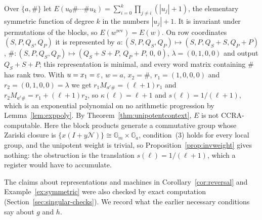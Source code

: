\begin{example}\label{ex:symmetric}
Over $\{a,\#\}$ let $E(u_0\#\cdots\#u_k)=\sum_{i=0}^k\prod_{j\ne i}(|u_j|+1)$, the elementary symmetric function of degree $k$ in the numbers $|u_j|+1$. It is invariant under permutations of the blocks, so $E(w^{\mathrm{rev}})=E(w)$. On row coordinates $(S,P,Q_S,Q_P)$ it is represented by $a:(S,P,Q_S,Q_P)\mapsto(S,P,Q_S+S,Q_P+P)$, $\#:(S,P,Q_S,Q_P)\mapsto(Q_S+S+P,\,Q_P+P,\,0,\,0)$, $\lambda=(0,1,0,0)$ and output $Q_S+S+P$; this representation is minimal, and every word matrix containing $\#$ has rank two. With $u=x_1=\varepsilon$, $w=a$, $x_2=\#$, $r_1=(1,0,0,0)$ and $r_2=(0,1,0,0)=\lambda$ we get $r_1M_{a^\ell\#}=(\ell+1)r_1$ and $r_2M_{a^\ell\#}=r_1+(\ell+1)r_2$, so $\kappa(\ell)=\ell+1$ and $s(\ell)=1/(\ell+1)$, which is an exponential polynomial on no arithmetic progression by Lemma~\ref{lem:exppoly}. By Theorem~\ref{thm:unipotentcontext}, $E$ is not CCRA-computable. Here the block products generate a commutative group whose Zariski closure is $\{x(I+y\mathcal N)\}\cong\mathbb G_m\times\mathbb G_a$, condition~(3) holds for every local group, and the unipotent weight is trivial, so Proposition~\ref{prop:invweight} gives nothing: the obstruction is the translation $s(\ell)=1/(\ell+1)$, which a register would have to accumulate.
\end{example}

The claims about representations and machines in Corollary~\ref{cor:reversal} and Example~\ref{ex:symmetric} were also checked by exact computation (Section~\ref{sec:singular-checks}). We record what the earlier necessary conditions say about $g$ and $h$.

